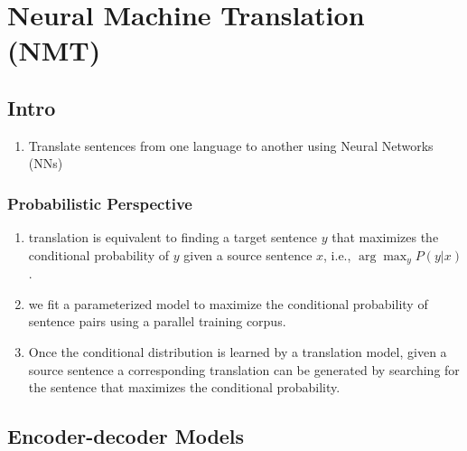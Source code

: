 \chapter{Neural Machine Translation (NMT)}

\section{Intro}

\begin{enumerate}
    \item Translate sentences from one language to another using Neural Networks (NNs)
\end{enumerate}


\subsection{Probabilistic Perspective}

\begin{enumerate}
    \item translation is equivalent to finding a target sentence $y$ that maximizes the conditional probability of $y$ given a source sentence $x$, i.e., $\arg\max_y P(y | x)$.
    \hfill \cite{adv-ml-tech/paper/arxiv.org/1409.0473}

    \item  we fit a parameterized model to maximize the conditional probability of sentence pairs using a parallel training corpus.
    \hfill \cite{adv-ml-tech/paper/arxiv.org/1409.0473}

    \item Once the conditional distribution is learned by a translation model, given a source sentence a corresponding translation can be generated by searching for the sentence that maximizes the conditional probability.
    \hfill \cite{adv-ml-tech/paper/arxiv.org/1409.0473}
\end{enumerate}


















\section{Encoder-decoder Models}

